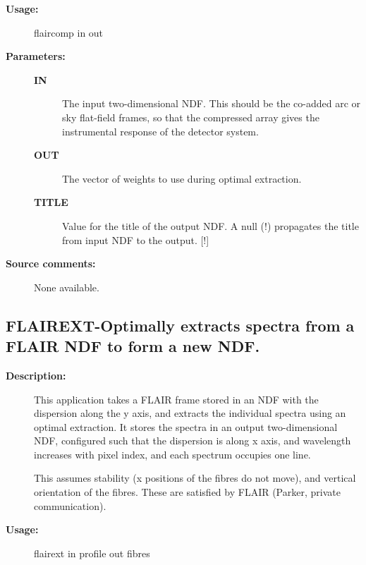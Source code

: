 \begin{description}
\begin{description}
\item [\textbf{Usage:}]
 flaircomp in out


\item [\textbf{Parameters:}]
\begin{description}
\item [\textbf{IN}]
 The input two-dimensional NDF.  This should be the co-added
 arc or sky flat-field frames, so that the compressed array
 gives the instrumental response of the detector system.
\item [\textbf{OUT}]
 The vector of weights to use during optimal extraction.
\item [\textbf{TITLE}]
 Value for the title of the output NDF.  A null (!) propagates
 the title from input NDF to the output. [!]

\end{description}

\item [\textbf{Source comments:}]
\begin{terminalv}
 None available.

\end{terminalv}
\end{description}
\subsection{FLAIREXT-\label{FLAIREXT}Optimally extracts spectra from a FLAIR NDF to form a new NDF.}
\begin{description}

\item [\textbf{Description:}]
 This application takes a FLAIR frame stored in an NDF with the
 dispersion along the y axis, and extracts the individual spectra
 using an optimal extraction.  It stores the spectra in an output
 two-dimensional NDF, configured such that the dispersion is along
 x axis, and wavelength increases with pixel index, and each
 spectrum occupies one line.

 This assumes stability (x positions of the fibres do not move),
 and vertical orientation of the fibres.  These are satisfied by
 FLAIR (Parker, private communication).

\item [\textbf{Usage:}]
 flairext in profile out fibres


\end{description}
\end{description}
